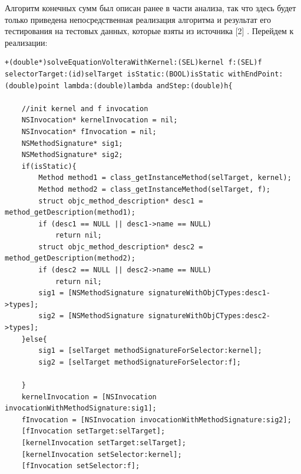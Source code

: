 Алгоритм конечных сумм был описан ранее в части анализа, так что здесь будет только приведена непосредственная реализация  алгоритма и результат его тестирования на тестовых данных, которые взяты из источника [2] . Перейдем к реализации:
\begin{lstlisting}
+(double*)solveEquationVolteraWithKernel:(SEL)kernel f:(SEL)f selectorTarget:(id)selTarget isStatic:(BOOL)isStatic withEndPoint:(double)point lambda:(double)lambda andStep:(double)h{
    
    //init kernel and f invocation
    NSInvocation* kernelInvocation = nil;
    NSInvocation* fInvocation = nil;
    NSMethodSignature* sig1;
    NSMethodSignature* sig2;
    if(isStatic){
        Method method1 = class_getInstanceMethod(selTarget, kernel);
        Method method2 = class_getInstanceMethod(selTarget, f);
        struct objc_method_description* desc1 = method_getDescription(method1);
        if (desc1 == NULL || desc1->name == NULL)
            return nil;
        struct objc_method_description* desc2 = method_getDescription(method2);
        if (desc2 == NULL || desc2->name == NULL)
            return nil;
        sig1 = [NSMethodSignature signatureWithObjCTypes:desc1->types];
        sig2 = [NSMethodSignature signatureWithObjCTypes:desc2->types];
    }else{
        sig1 = [selTarget methodSignatureForSelector:kernel];
        sig2 = [selTarget methodSignatureForSelector:f];
        
    }
    kernelInvocation = [NSInvocation invocationWithMethodSignature:sig1];
    fInvocation = [NSInvocation invocationWithMethodSignature:sig2];
    [fInvocation setTarget:selTarget];
    [kernelInvocation setTarget:selTarget];
    [kernelInvocation setSelector:kernel];
    [fInvocation setSelector:f];
    

\end{lstlisting}
